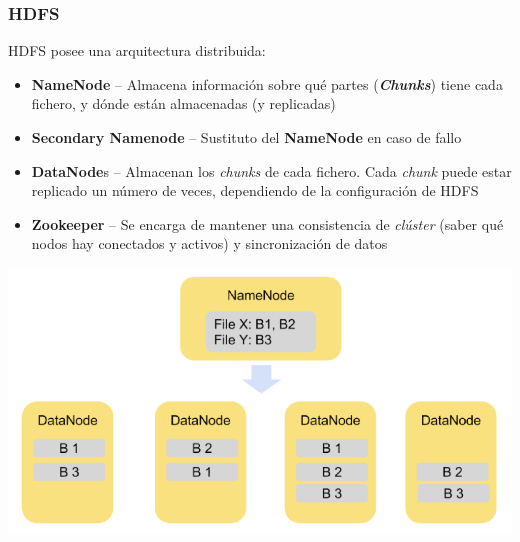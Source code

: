\documentclass[14pt]{beamer}
\begin{document}
\begin{frame}[allowframebreaks]
  \frametitle{HDFS}
HDFS posee una arquitectura distribuida:
    \begin{itemize}
    \item {\bf NameNode} -- Almacena información sobre qué partes
      ({\bfseries\itshape Chunks}) tiene cada fichero, y dónde están
      almacenadas (y replicadas)
    \item {\bf Secondary Namenode} -- Sustituto del {\bf NameNode} en caso
      de fallo
    \item {\bf DataNode}s -- Almacenan los {\em chunks\/} de cada fichero.
      Cada {\em chunk} puede estar replicado un número de veces,
      dependiendo de la configuración de HDFS
    \item {\bf Zookeeper} -- Se encarga de mantener una consistencia de
      {\em clúster} (saber qué nodos hay conectados y activos) y
      sincronización de datos
    \end{itemize}
  \includegraphics[width=\textwidth]{img/hdfs1}
\end{frame}





\end{document}
